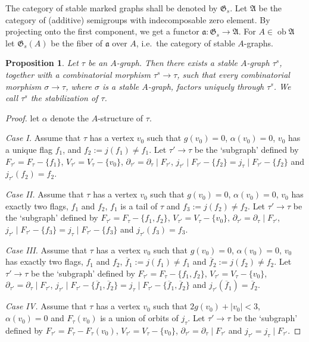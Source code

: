 \documentclass[11pt]{amsart}
\newtheorem{prop}{Proposition}[section]
\theoremstyle{definition}
\theoremstyle{remark}
\newenvironment{pf}{\begin{proof}}{\end{proof}}
\renewcommand{\AA}{{\mathfrak{A}}}
\newcommand{\GG}{{\mathfrak{G}}}
\newcommand{\Aa}{{\mathfrak{a}}}
\newcommand{\del}{\partial}
\newcommand{\resto}{{ \mid }}
\newcommand{\ob}{\operatorname{ob}}
\newcommand{\ol}{\overline}
\renewcommand{\t}{_{\tau}}
\theoremstyle{plain}
\theoremstyle{definition}
\theoremstyle{remark}
\begin{document}
The category of stable marked graphs shall be denoted by \(\GG_s\). Let \(\AA\) be
the category of (additive) semigroups with
indecomposable zero element. By projecting onto the first component, we get a
functor \(\Aa:\GG_s\rightarrow\AA\). For
\(A\in\ob\AA\) let \(\GG_s(A)\) be the fiber of \(\Aa\) over \(A\), i.e.\ the category
of stable \(A\)-graphs.

\begin{prop} \label{ppes}
Let \(\tau\) be an \(A\)-graph. Then there exists a stable \(A\)-graph \(\tau^s\),
together with a combinatorial morphism
\(\tau^s\rightarrow\tau\), such that every combinatorial morphism
\(\sigma\rightarrow\tau\), where \(\sigma\) is a stable
\(A\)-graph, factors uniquely through \(\tau^s\). We call \(\tau^s\) the {\em
stabilization  }of \(\tau\).
\end{prop}
\begin{pf}
let \(\alpha\) denote the \(A\)-structure of \(\tau\).

{\em Case I\@. }Assume that \(\tau\) has a vertex \(v_0\) such that
 \(g(v_0)=0\),
 \(\alpha(v_0)=0\),
 \(v_0\) has a unique flag \(f_1\), and
 \(f_2:=j(f_1)\not=f_1\).
Let \(\tau'\rightarrow\tau\) be the `subgraph' defined by
 \(F_{\tau'}=F\t-\{f_1\}\),
 \(V_{\tau'}=V\t-\{v_0\}\),
 \(\del_{\tau'}=\del\t\resto F_{\tau'}\),
 \(j_{\tau'}\resto F_{\tau'}-\{f_2\}=j\t\resto F_{\tau'}-\{f_2\}\) and
\(j_{\tau'}(f_2)=f_2\).

{\em Case II\@. }Assume that \(\tau\) has a vertex \(v_0\) such that
 \(g(v_0)=0\),
 \(\alpha(v_0)=0\),
 \(v_0\) has exactly two flags, \(f_1\) and \(f_2\),
 \(f_1\) is a tail of \(\tau\) and
 \(f_3:=j(f_2)\not=f_2\).
Let \(\tau'\rightarrow\tau\) be the `subgraph' defined by
 \(F_{\tau'}=F\t-\{f_1,f_2\}\),
 \(V_{\tau'}=V\t-\{v_0\}\),
 \(\del_{\tau'}=\del\t\resto F_{\tau'}\),
 \(j_{\tau'}\resto F_{\tau'}-\{f_3\}=j\t\resto F_{\tau'}-\{f_3\}\) and
\(j_{\tau'}(f_3)=f_3\).

{\em Case III\@. }Assume that \(\tau\) has a vertex \(v_0\) such that
 \(g(v_0)=0\),
 \(\alpha(v_0)=0\),
 \(v_0\) has exactly two flags, \(f_1\) and \(f_2\),
 \(\ol{f}_1:=j(f_1)\not=f_1\) and \(\ol{f}_2:=j(f_2)\not=f_2\).
Let \(\tau'\rightarrow\tau\) be the `subgraph' defined by
 \(F_{\tau'}=F\t-\{f_1,f_2\}\),
 \(V_{\tau'}=V\t-\{v_0\}\),
 \(\del_{\tau'}=\del\t\resto F_{\tau'}\),
 \(j_{\tau'}\resto F_{\tau'}-\{\ol{f}_1,\ol{f}_2\}=j\t\resto
F_{\tau'}-\{\ol{f}_1,\ol{f}_2\}\) and \(j_{\tau'}(\ol{f}_1)=\ol{f}_2\).

{\em Case IV\@. }Assume that \(\tau\) has a vertex \(v_0\) such that
 \(2g(v_0)+|v_0|<3\),
 \(\alpha(v_0)=0\) and
 \(F\t(v_0)\) is a union of orbits of \(j\t\).
Let \(\tau'\rightarrow\tau\) be the `subgraph' defined by
 \(F_{\tau'}=F\t-F\t(v_0)\),
 \(V_{\tau'}=V\t-\{v_0\}\),
 \(\del_{\tau'}=\del\t\resto F_{\tau'}\) and
 \(j_{\tau'}=j\t\resto F_{\tau'}\).


\end{pf}
\end{document}
